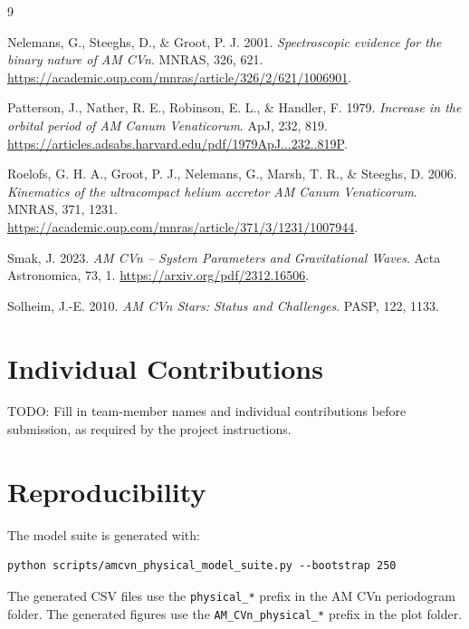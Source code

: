 \documentclass[11pt]{article}
\begin{document}
\begin{thebibliography}{9}

Nelemans, G., Steeghs, D., \& Groot, P. J. 2001.
\textit{Spectroscopic evidence for the binary nature of AM CVn}.
MNRAS, 326, 621.
\url{https://academic.oup.com/mnras/article/326/2/621/1006901}.

Patterson, J., Nather, R. E., Robinson, E. L., \& Handler, F. 1979.
\textit{Increase in the orbital period of AM Canum Venaticorum}.
ApJ, 232, 819.
\url{https://articles.adsabs.harvard.edu/pdf/1979ApJ...232..819P}.

Roelofs, G. H. A., Groot, P. J., Nelemans, G., Marsh, T. R., \& Steeghs, D. 2006.
\textit{Kinematics of the ultracompact helium accretor AM Canum Venaticorum}.
MNRAS, 371, 1231.
\url{https://academic.oup.com/mnras/article/371/3/1231/1007944}.

Smak, J. 2023.
\textit{AM CVn -- System Parameters and Gravitational Waves}.
Acta Astronomica, 73, 1.
\url{https://arxiv.org/pdf/2312.16506}.

Solheim, J.-E. 2010.
\textit{AM CVn Stars: Status and Challenges}.
PASP, 122, 1133.

\end{thebibliography}

\appendix
\section{Individual Contributions}

TODO: Fill in team-member names and individual contributions before
submission, as required by the project instructions.

\section{Reproducibility}

The model suite is generated with:
\begin{verbatim}
python scripts/amcvn_physical_model_suite.py --bootstrap 250
\end{verbatim}
The generated CSV files use the \texttt{physical\_*} prefix in the AM CVn
periodogram folder.  The generated figures use the
\texttt{AM\_CVn\_physical\_*} prefix in the plot folder.
\end{document}
